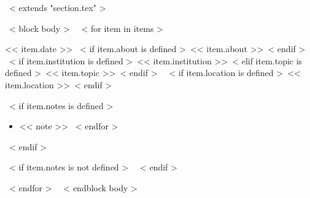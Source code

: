 ~< extends "section.tex" >~

~< block body >~
  ~< for item in items >~
    \begin{samepage}
      \cventry
        {<< item.date >>}
        {~< if item.about is defined >~<< item.about >>~< endif >~}
        {~< if item.institution is defined >~<< item.institution >>~< elif item.topic is defined >~<< item.topic >>~< endif >~}
        {~< if item.location is defined >~<< item.location >>~< endif >~}
        {}
        { %
          ~< if item.notes is defined >~
            \begin{itemize}
              ~< for note in item.notes >~
                \item{<< note >>}
              ~< endfor >~
            \end{itemize}
          ~< endif >~
        }
        ~< if item.notes is not defined >~
          \vspace{-1em}
        ~< endif >~
    \end{samepage}
    \vspace{10pt}
  ~< endfor >~
  \vspace{-10pt}
~< endblock body >~
